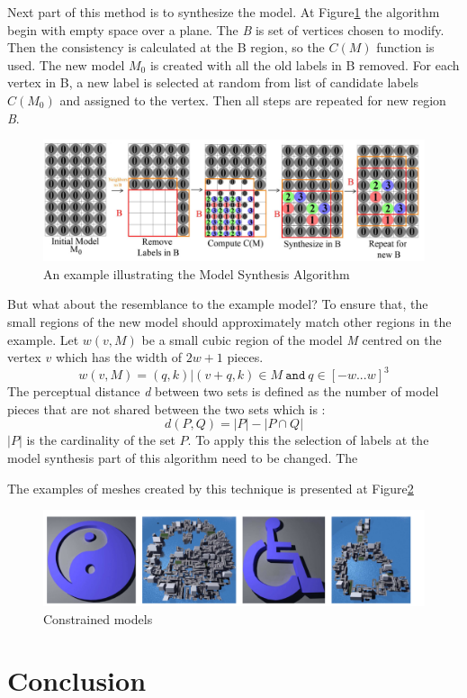 \documentclass[b5paper,twoside,11pt]{article}
\renewcommand{\figurename}{Figure}
\begin{document}
Next part of this method is to synthesize the model. At \figurename\ref{ModSynth} the algorithm begin with empty space over a plane. The \textit{B} is set of vertices chosen to modify. Then the consistency is calculated at the B region, so the $C(M)$ function is used. The new model $M_0$ is created with all the old labels in B removed. For each vertex in B, a new label is selected at random from  list of candidate labels $C(M_0 )$ and assigned to the vertex. Then all steps are repeated for new region \textit{B}.


\begin{figure}[!h]
	\centering
	\includegraphics[width=1.1	\textwidth]{modelSynthesis}
	\caption{An example illustrating the Model Synthesis Algorithm}
	\label{ModSynth}
\end{figure}



But what about the resemblance to the example model? To ensure that, the small regions of the new model should approximately match other regions in the example. Let $w(v,M)$ be a small cubic region of the model \textit{M} centred on the vertex $v$ which has the width of $2w +1$ pieces.
\begin{equation}
w(v,M) = {(q,k)|(v+q,k) \in M \:\mathtt{and}\: q\in [-w...w]^3}
\end{equation}
The perceptual distance \textit{d} between two sets is defined as the number of model pieces that are not shared between the two sets which is :
\begin{equation}
d(P,Q) = |P| - |P \cap Q|
\end{equation}
$|P|$ is the cardinality of the set $P$.
To apply this the selection of labels at the model synthesis part of this algorithm need to be changed. The

The examples of meshes created by this technique is presented at \figurename\ref{exampleMS}
\begin{figure}[h]
	\centering
	\includegraphics[width=0.9	\textwidth]{exampleMS}
	\caption{Constrained models}
	\label{exampleMS}
\end{figure}

\newpage
\section{Conclusion}

 

\end{document}
